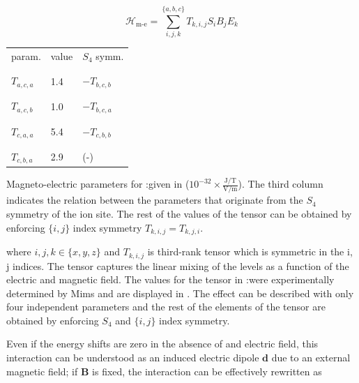 \begin{equation}
    \mathcal{H}_{\text{m-e}} = \sum_{i,j,k}^{\{a,b,c\}} T_{k, i, j} S_{i} B_j E_k
\end{equation}

\begin{margintable}
\centering
\begin{tabular}{l|l|l}
param.         & value  & $S_4$ symm.   \\[-1em] \\ \hline \\[-1em]
$T_{a,c,a}$    & 1.4    & $-T_{b,c,b}$  \\[-1em] \\ \hline \\[-1em]
$T_{a,c,b}$    & 1.0    & $-T_{b,c,a}$  \\[-1em] \\ \hline \\[-1em]
$T_{c,a,a}$    & 5.4    & $-T_{c,b,b}$  \\[-1em] \\ \hline \\[-1em]
$T_{c,b,a}$    & 2.9    &  (-) 
\end{tabular}
\caption[Magneto-optic parameters]{Magneto-electric parameters for \Er:\Ca given in ($10^{-32} \times \frac{\text{J/T}}{\text{V/m}}$). The third column indicates the relation between the parameters that originate from the $S_4$ symmetry of the ion site. The rest of the values of the tensor can be obtained by enforcing $\{i, j\}$ index symmetry $T_{k, i, j} = T_{k, j, i}$.}
\end{margintable}

where $i,j,k \in\{x,y,z\}$ and $T_{k, i, j}$ is third-rank tensor which is symmetric in the {i, j} indices. The tensor captures the linear mixing of the levels as a function of the electric and magnetic field. The values for the tensor in \Er:\Ca were experimentally determined by Mims  and are displayed in . The effect can be described with only four independent parameters and the rest of the elements of the tensor are obtained by enforcing $S_4$ and $\{i, j\}$ index symmetry.

Even if the energy shifts are zero in the absence of and electric field, this interaction can be understood as an induced electric dipole $\mathbf{d}$ due to an external magnetic field; if $\mathbf{B}$ is fixed, the interaction can be effectively rewritten as 


